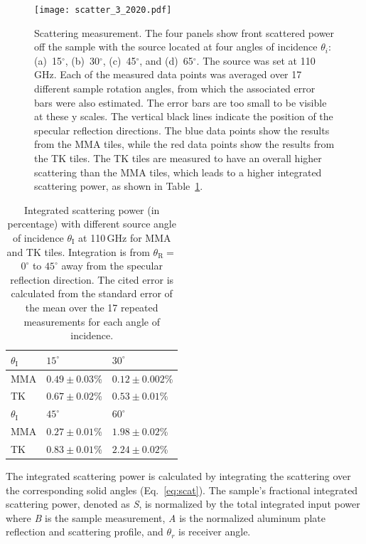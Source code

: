 \begin{figure}
    \centering
    \texttt{[image: scatter\_3\_2020.pdf]}
    \caption{Scattering measurement. The four panels show front scattered power off the sample with the source located at four angles of incidence $\theta_i$: (a) \,15$^{\circ}$, (b) \,30$^{\circ}$, (c) \,45$^{\circ}$, and (d) \,65$^{\circ}$. The source was set at 110\,GHz. Each of the measured data points was averaged over 17 different sample rotation angles, from which the associated error bars were also estimated. The error bars are too small to be visible at these y scales. The vertical black lines indicate the position of the specular reflection directions. The blue data points show the results from the MMA tiles, while the red data points show the results from the TK tiles. The TK tiles are measured to have an overall higher scattering than the MMA tiles, which leads to a higher integrated scattering power, as shown in Table~\ref{tab:scat}.}
    \label{fig:scatter}
\end{figure}

\begin{table}[ht]
\centering
\begin{tabularx}{0.45\textwidth}{>{\centering\arraybackslash}X >{\centering\arraybackslash}X >{\centering\arraybackslash}X}
    \hline
    \hline
    $\theta_\text{I}$ & $15^{\circ}$ & $30^{\circ}$ \\
    \hline
    MMA & $0.49\pm0.03$\% &$0.12\pm0.002$\% \\
    TK  & $0.67\pm0.02$\% &$0.53\pm0.01$\%  \\
    \hline
    \hline
    $\theta_\text{I}$ & $45^{\circ}$ & $60^{\circ}$ \\
    \hline    
    MMA & $0.27\pm0.01$\% &$1.98\pm0.02$\% \\
    TK  & $0.83\pm0.01$\% &$2.24\pm0.02$\% \\
    \hline
\end{tabularx}
\caption{Integrated scattering power (in percentage) with different source angle of incidence $\theta_\text{I}$ at 110\,GHz for MMA and TK tiles. Integration is from $\theta_\text{R}=$ $0^{\circ}$ to $45^{\circ}$ away from the specular reflection direction. The cited error is calculated from the standard error of the mean over the 17 repeated measurements for each angle of incidence.}
  \label{tab:scat}
\end{table}

The integrated scattering power is calculated by integrating the scattering over the corresponding solid angles (Eq.~\ref{eq:scat}). The sample's fractional integrated scattering power, denoted as \textit{S}, is normalized by the total integrated input power where \textit{B} is the sample measurement, \textit{A} is the normalized aluminum plate reflection and scattering profile, and $\theta_r$ is receiver angle.

